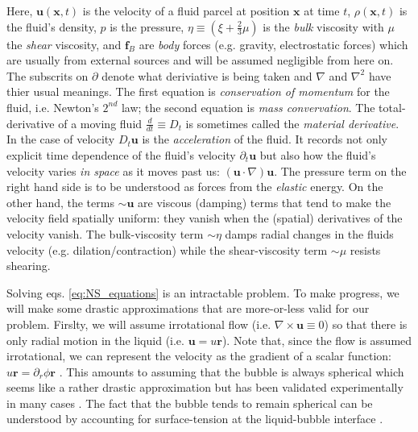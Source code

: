 \documentclass[rmp,aps,nofootinbib,superscriptaddress,floatfix]{revtex4-2}
\begin{document}
Here, $\bm{u}(\bm{x},t)$ is the velocity of a fluid parcel at position $\bm{x}$ at time $t$, $\rho (\bm{x},t)$ is the fluid's density, $p$ is the pressure, $\eta \equiv \left(\xi + \frac{2}{3}\mu \right)$ is the \emph{bulk} viscosity with $\mu$ the \emph{shear} viscosity, and $\bm{f}_B$ are \emph{body} forces (e.g. gravity, electrostatic forces) which are usually from external sources and will be assumed negligible from here on. The subscrits on $\partial$ denote what deriviative is being taken and $\nabla$ and $\nabla^2$ have thier usual meanings. The first equation is \emph{conservation of momentum} for the fluid, i.e. Newton's $2^{nd}$ law; the second equation is \emph{mass convervation}. The total-derivative of a moving fluid $\frac{d}{dt}\equiv D_t$ is sometimes called the \emph{material derivative}. In the case of velocity $D_t \bm{u}$ is the \emph{acceleration} of the fluid. It records not only explicit time dependence of the fluid's velocity $\partial_t \bm{u}$ but also how the fluid's velocity varies \emph{in space} as it moves past us: $\left( \bm{u}\cdot\nabla \right) \bm{u}$. The pressure term on the right hand side is to be understood as forces from the \emph{elastic} energy. On the other hand, the terms $\sim \bm{u}$ are viscous (damping) terms that tend to make the velocity field spatially uniform: they vanish when the (spatial) derivatives of the velocity vanish. The bulk-viscosity term $\sim \eta$ damps radial changes in the fluids velocity (e.g. dilation/contraction) while the shear-viscosity term $\sim\mu$ resists shearing. 

Solving eqs. \ref{eq:NS_equations} is an intractable problem. To make progress, we will make some drastic approximations that are more-or-less valid for our problem. Firslty, we will assume irrotational flow (i.e. $\nabla\times\bm{u}\equiv 0$) so that there is only radial motion in the liquid (i.e. $\bm{u}=u\bm{r}$). Note that, since the flow is assumed irrotational, we can represent the velocity as the gradient of a scalar function: $u\bm{r}=\partial_r \phi \bm{r}$ \cite{jackson1999classical}. This amounts to assuming that the bubble is always spherical which seems like a rather drastic approximation but has been validated experimentally in many cases \cite{}. The fact that the bubble tends to remain spherical can be understood by accounting for surface-tension at the liquid-bubble interface \cite{prosperetti1999old}. 
\end{document}
